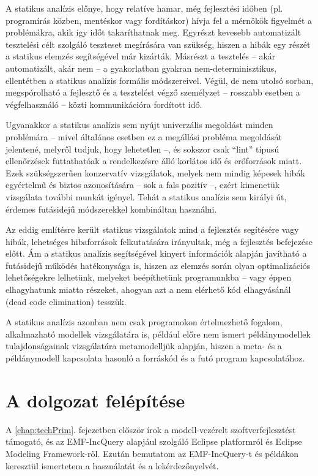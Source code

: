 A statikus analízis előnye, hogy relatíve hamar, még fejlesztési időben (pl. programírás közben, mentéskor vagy fordításkor) hívja fel a mérnökök figyelmét a problémákra, akik így időt takaríthatnak meg.
Egyrészt kevesebb automatizált tesztelési célt szolgáló teszteset megírására van szükség, hiszen a hibák egy részét a statikus elemzés segítségével már kizárták.
Másrészt a tesztelés -- akár automatizált, akár nem -- a gyakorlatban gyakran nem-determinisztikus, ellentétben a statikus analízis formális módszereivel.
Végül, de nem utolsó sorban, megspórolható a fejlesztő és a tesztelést végző személyzet -- rosszabb esetben a végfelhasználó -- közti kommunikációra fordított idő.

Ugyanakkor a statikus analízis sem nyújt univerzális megoldást minden problémára -- mivel általános esetben ez a megállási probléma megoldását jelentené, melyről tudjuk, hogy lehetetlen --, és sokszor csak ``lint'' típusú ellenőrzések futtathatóak a rendelkezésre álló korlátos idő és erőforrások miatt.
Ezek szükségszerűen konzervatív vizsgálatok, melyek nem mindig képesek hibák egyértelmű és biztos azonosítására -- sok a fals pozitív --, ezért kimenetük vizsgálata további munkát igényel.
Tehát a statikus analízis sem királyi út, érdemes futásidejű módszerekkel kombináltan használni.

Az eddig említésre került statikus vizsgálatok mind a fejlesztés segítésére vagy hibák, lehetséges hibaforrások felkutatására irányultak, még a fejlesztés befejezése előtt.
Ám a statikus analízis segítségével kinyert információk alapján javítható a futásidejű működés hatékonysága is, hiszen az elemzés során olyan optimalizációs lehetőségekre lelhetünk, melyeket beépíthetünk programunkba -- vagy éppen elhagyhatunk miatta részeket, ahogyan azt a nem elérhető kód elhagyásánál (dead code elimination) tesszük.

A statikus analízis azonban nem csak programokon értelmezhető fogalom, alkalmazható modellek vizsgálatára is, például előre nem ismert példánymodellek tulajdonságainak vizsgálatára metamodelljük alapján, hiszen a meta- és a példánymodell kapcsolata hasonló a forráskód és a futó program kapcsolatához.

\section{A dolgozat felépítése}

A \ref{chap:techPrim}. fejezetben először írok a modell-vezérelt szoftverfejlesztést támogató, és az EMF-IncQuery alapjául szolgáló Eclipse platformról és Eclipse Modeling Framework-ről.
Ezután bemutatom az EMF-IncQuery-t és példákon keresztül ismertetem a használatát és a lekérdezőnyelvét.


